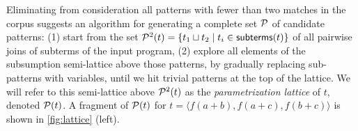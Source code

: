 

%
Eliminating from consideration all patterns with fewer than two matches in the corpus
suggests an algorithm for generating a complete set $\mathcal{P}$ of candidate patterns:
  (1) start from the set $\mathcal{P}^2(t) = \{t_1 \sqcup t_2 \mid t_i \in \mathsf{subterms}(t)\}$
      of all pairwise joins of subterms of the input program,
  (2) explore all elements of the subsumption semi-lattice above those patterns,
      by gradually replacing sub-patterns with variables,
      until we hit trivial patterns at the top of the lattice.
%
We will refer to this semi-lattice above $\mathcal{P}^2(t)$ as the \emph{parametrization lattice} of $t$, 
denoted $\mathcal{P}(t)$.
%
A fragment of $\mathcal{P}(t)$ for $t = \langle f(a+b), f(a+c), f(b+c)\rangle$ is shown in \autoref{fig:lattice} (left).






